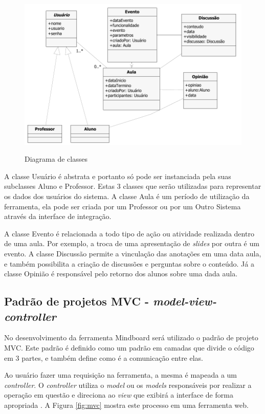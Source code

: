 \begin{figure}[!h]
\centering
\caption{Diagrama de classes}
\includegraphics[width=1.0\textwidth]{pdfs/img-class-diagram.pdf} 
\label{fig:class_diagram} 
\end{figure}

A classe Usuário é abstrata e portanto só pode ser instanciada pela suas subclasses Aluno e Professor. Estas 3 classes que serão utilizadas para representar os dados dos usuários do sistema. A classe Aula é um período de utilização da ferramenta, ela pode ser criada por um Professor ou por um Outro Sistema através da interface de integração.

A classe Evento é relacionada a todo tipo de ação ou atividade realizada dentro de uma aula. Por exemplo, a troca de uma apresentação de \emph{slides} por outra é um evento. A classe Discussão permite a vinculação das anotações em uma data aula, e também possibilita a criação de discussões e perguntas sobre o conteúdo. Já a classe Opinião é responsável pelo retorno dos alunos sobre uma dada aula. 

\iffalse
\subsection{Padrão de projetos MVC - \emph{model-view-controller}}

No desenvolvimento da ferramenta Mindboard será utilizado o padrão de projeto MVC. Este padrão é definido como um padrão em camadas \cite{pressman} que divide o código em 3 partes, e também define como é a comunicação entre elas.

Ao usuário fazer uma requisição na ferramenta, a mesma é mapeada a um \emph{controller}. O \emph{controller} utiliza o \emph{model} ou os \emph{models} responsáveis por realizar a operação em questão e direciona ao \emph{view} que exibirá a interface de forma apropriada \cite{mvc}. A Figura \ref{fig:mvc} mostra este processo em uma ferramenta web.

